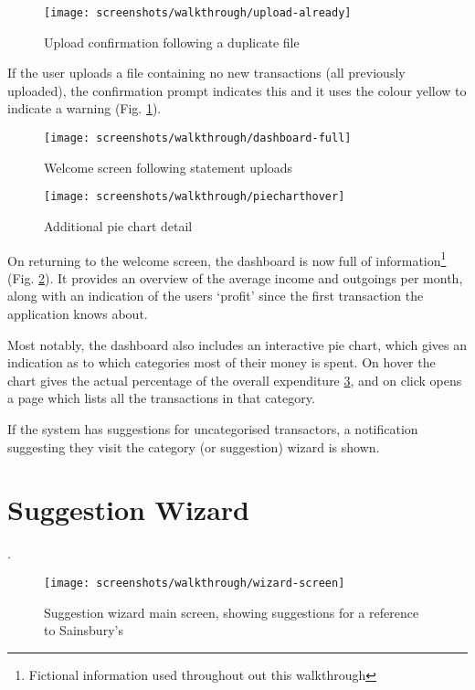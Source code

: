 \begin{figure}
\centering
\texttt{[image: screenshots/walkthrough/upload-already]}
\caption{Upload confirmation following a duplicate file}
\label{fig:upload-duplicate}
\end{figure}

If the user uploads a file containing no new transactions (all previously uploaded), the confirmation prompt indicates this and it uses the colour yellow to indicate a warning (Fig. \ref{fig:upload-duplicate}).

\begin{figure}
\centering
\texttt{[image: screenshots/walkthrough/dashboard-full]}
\caption{Welcome screen following statement uploads}
\label{fig:welcome-full}
\end{figure}

\begin{figure}
\centering
\texttt{[image: screenshots/walkthrough/piecharthover]}
\caption{Additional pie chart detail}
\label{fig:piecharthover}
\end{figure}

On returning to the welcome screen, the dashboard is now full of information\footnote{Fictional information used throughout out this walkthrough} (Fig. \ref{fig:welcome-full}). It provides an overview of the average income and outgoings per month, along with an indication of the users `profit' since the first transaction the application knows about. 

Most notably, the dashboard also includes an interactive pie chart, which gives an indication as to which categories most of their money is spent. On hover the chart gives the actual percentage of the overall expenditure \ref{fig:piecharthover}, and on click opens a page which lists all the transactions in that category.

If the system has suggestions for uncategorised transactors, a notification suggesting they visit the category (or suggestion) wizard is shown.

\section{Suggestion Wizard}
\label{subsection:suggestion-wizard-walkthrough}.

\begin{figure}
\centering
\texttt{[image: screenshots/walkthrough/wizard-screen]}
\caption[Suggestion wizard main screen]{Suggestion wizard main screen, showing suggestions for a reference to Sainsbury's}
\label{fig:wizard-screen}
\end{figure}

